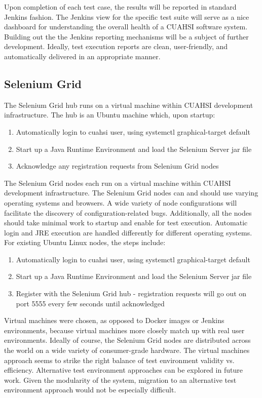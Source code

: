 \documentclass[10pt]{article}
\begin{document}
Upon completion of each test case, the results will be reported in standard Jenkins fashion.  The Jenkins view for the specific test suite will serve as a nice dashboard for understanding the overall health of a CUAHSI software system.  Building out the the Jenkins reporting mechanisms will be a subject of further development.  Ideally, test execution reports are clean, user-friendly, and automatically delivered in an appropriate manner.

\subsection{Selenium Grid}
The Selenium Grid hub runs on a virtual machine within CUAHSI development infrastructure.  The hub is an Ubuntu machine which, upon startup:
\begin{enumerate}
  \item Automatically login to cuahsi user, using systemctl graphical-target default
  \item Start up a Java Runtime Environment and load the Selenium Server jar file
  \item Acknowledge any registration requests from Selenium Grid nodes
\end{enumerate}
The Selenium Grid nodes each run on a virtual machine within CUAHSI development infrastructure.  The Selenium Grid nodes can and should use varying operating systems and browsers.  A wide variety of node configurations will facilitate the discovery of configuration-related bugs.  Additionally, all the nodes should take minimal work to startup and enable for test execution.  Automatic login and JRE execution are handled differently for different operating systems.  For existing Ubuntu Linux nodes, the steps include: 
\begin{enumerate}
  \item Automatically login to cuahsi user, using systemctl graphical-target default
  \item Start up a Java Runtime Environment and load the Selenium Server jar file
  \item Register with the Selenium Grid hub - registration requests will go out on port 5555 every few seconds until acknowledged
\end{enumerate}

Virtual machines were chosen, as opposed to Docker images or Jenkins environments, because virtual machines more closely match up with real user environments.  Ideally of course, the Selenium Grid nodes are distributed across the world on a wide variety of consumer-grade hardware.  The virtual machines approach seems to strike the right balance of test environment validity vs. efficiency.  Alternative test environment approaches can be explored in future work.  Given the modularity of the system, migration to an alternative test environment approach would not be especially difficult.
\end{document}
